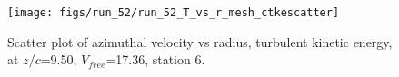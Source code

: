 \begin{figure}[H]
\centering
\texttt{[image: figs/run\_52/run\_52\_T\_vs\_r\_mesh\_ctkescatter]}
\caption{Scatter plot of azimuthal velocity vs radius, turbulent kinetic energy, at $z/c$=9.50, $V_{free}$=17.36, station 6.}
\label{fig:run_52_T_vs_r_mesh_ctkescatter}
\end{figure}



